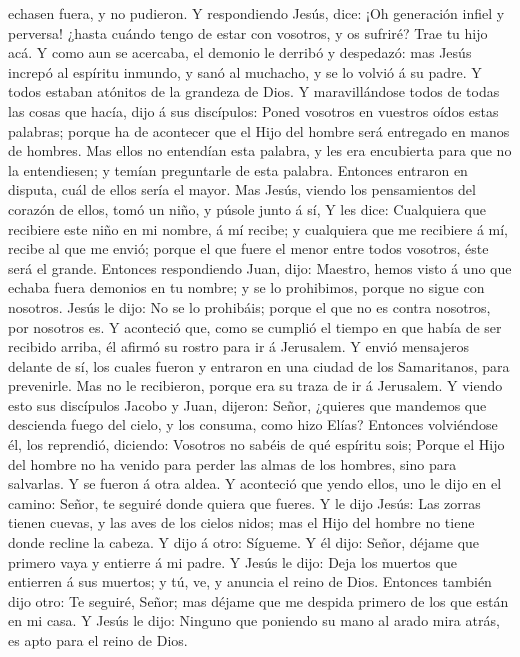 echasen fuera, y no pudieron.  Y respondiendo Jesús, dice:
¡Oh generación infiel y perversa! ¿hasta cuándo tengo de estar con
vosotros, y os sufriré? Trae tu hijo acá.  Y como aun se
acercaba, el demonio le derribó y despedazó: mas Jesús increpó al
espíritu inmundo, y sanó al muchacho, y se lo volvió á su padre.
 Y todos estaban atónitos de la grandeza de Dios. Y
maravillándose todos de todas las cosas que hacía, dijo á sus
discípulos:  Poned vosotros en vuestros oídos estas
palabras; porque ha de acontecer que el Hijo del hombre será entregado
en manos de hombres.  Mas ellos no entendían esta palabra,
y les era encubierta para que no la entendiesen; y temían preguntarle de
esta palabra.  Entonces entraron en disputa, cuál de ellos
sería el mayor.  Mas Jesús, viendo los pensamientos del
corazón de ellos, tomó un niño, y púsole junto á sí,  Y les
dice: Cualquiera que recibiere este niño en mi nombre, á mí recibe; y
cualquiera que me recibiere á mí, recibe al que me envió; porque el que
fuere el menor entre todos vosotros, éste será el grande. 
Entonces respondiendo Juan, dijo: Maestro, hemos visto á uno que echaba
fuera demonios en tu nombre; y se lo prohibimos, porque no sigue con
nosotros.  Jesús le dijo: No se lo prohibáis; porque el que
no es contra nosotros, por nosotros es.  Y aconteció que,
como se cumplió el tiempo en que había de ser recibido arriba, él afirmó
su rostro para ir á Jerusalem.  Y envió mensajeros delante
de sí, los cuales fueron y entraron en una ciudad de los Samaritanos,
para prevenirle.  Mas no le recibieron, porque era su traza
de ir á Jerusalem.  Y viendo esto sus discípulos Jacobo y
Juan, dijeron: Señor, ¿quieres que mandemos que descienda fuego del
cielo, y los consuma, como hizo Elías?  Entonces
volviéndose él, los reprendió, diciendo: Vosotros no sabéis de qué
espíritu sois;  Porque el Hijo del hombre no ha venido para
perder las almas de los hombres, sino para salvarlas. Y se fueron á otra
aldea.  Y aconteció que yendo ellos, uno le dijo en el
camino: Señor, te seguiré donde quiera que fueres.  Y le
dijo Jesús: Las zorras tienen cuevas, y las aves de los cielos nidos;
mas el Hijo del hombre no tiene donde recline la cabeza.  Y
dijo á otro: Sígueme. Y él dijo: Señor, déjame que primero vaya y
entierre á mi padre.  Y Jesús le dijo: Deja los muertos que
entierren á sus muertos; y tú, ve, y anuncia el reino de Dios.
 Entonces también dijo otro: Te seguiré, Señor; mas déjame
que me despida primero de los que están en mi casa.  Y
Jesús le dijo: Ninguno que poniendo su mano al arado mira atrás, es apto
para el reino de Dios.

